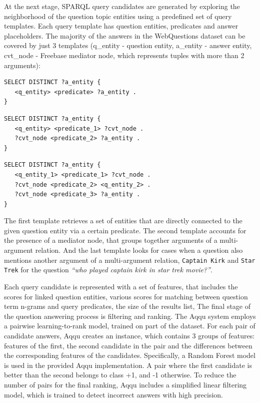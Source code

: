 At the next stage, SPARQL query candidates are generated by exploring the neighborhood of the question topic entities using a predefined set of query templates.
Each query template has question entities, predicates and answer placeholders.
The majority of the answers in the WebQuestions dataset can be covered by just 3 templates (q\_entity - question entity, a\_entity - answer entity, cvt\_node - Freebase mediator node, which represents tuples with more than 2 arguments):
\\

\begin{minipage}{\linewidth}
\begin{lstlisting}[frame=single,basicstyle=\small]
SELECT DISTINCT ?a_entity {
   <q_entity> <predicate> ?a_entity .
}
\end{lstlisting}
\end{minipage}

\begin{minipage}{\linewidth}
\begin{lstlisting}[frame=single,basicstyle=\small]
SELECT DISTINCT ?a_entity {
   <q_entity> <predicate_1> ?cvt_node .
   ?cvt_node <predicate_2> ?a_entity .
}
\end{lstlisting}
\end{minipage}

\begin{minipage}{\linewidth}
\begin{lstlisting}[frame=single,basicstyle=\small]
SELECT DISTINCT ?a_entity {
   <q_entity_1> <predicate_1> ?cvt_node .
   ?cvt_node <predicate_2> <q_entity_2> .
   ?cvt_node <predicate_3> ?a_entity .
}
\end{lstlisting}
\end{minipage}

The first template retrieves a set of entities that are directly connected to the given question entity via a certain predicate.
The second template accounts for the presence of a mediator node, that groups together arguments of a multi-argument relation.
And the last template looks for cases when a question also mentions another argument of a multi-argument relation, \eg \texttt{Captain Kirk} and \texttt{Star Trek} for the question \textit{``who played captain kirk in star trek movie?''}.

Each query candidate is represented with a set of features, that includes the scores for linked question entities, various scores for matching between question term n-grams and query predicates, the size of the results list, \etc
The final stage of the question answering process is filtering and ranking.
The Aqqu system employs a pairwise learning-to-rank model, trained on part of the dataset.
For each pair of candidate answers, Aqqu creates an instance, which contains 3 groups of features: features of the first, the second candidate in the pair and the differences between the corresponding features of the candidates. Specifically, a Random Forest model is used in the provided Aqqu implementation. 
A pair where the first candidate is better than the second belongs to class +1, and -1 otherwise.
To reduce the number of pairs for the final ranking, Aqqu includes a simplified linear filtering model, which is trained to detect incorrect answers with high precision. 

